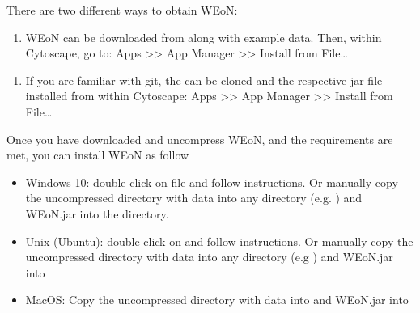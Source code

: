 \documentclass[letterpaper,10pt,english]{sphinxmanual}
\begin{document}

There are two different ways to obtain WEoN:
\begin{enumerate}
\def\theenumi{\arabic{enumi}}
\def\labelenumi{\theenumi .}
\makeatletter\def\p@enumii{\p@enumi \theenumi .}\makeatother
\item {} 
 WEoN can be downloaded from  along with example data. Then, within Cytoscape, go to: Apps \textgreater{}\textgreater{} App Manager \textgreater{}\textgreater{} Install from File…

\end{enumerate}
\begin{enumerate}
\def\theenumi{\arabic{enumi}}
\def\labelenumi{\theenumi .}
\makeatletter\def\p@enumii{\p@enumi \theenumi .}\makeatother
\setcounter{enumi}{1}
\item {} 
 If you are familiar
with git, the  can be cloned and the respective jar file installed from within Cytoscape: Apps \textgreater{}\textgreater{} App Manager \textgreater{}\textgreater{} Install from File…

\end{enumerate}


Once you have downloaded and uncompress WEoN, and the requirements are met, you can install WEoN as follow
\begin{itemize}
\item {} 
Windows 10: double click on  file and follow instructions. Or manually copy the uncompressed directory with data into any directory (e.g. ) and WEoN.jar into the  directory.

\item {} 
Unix (Ubuntu): double click on  and follow instructions. Or manually copy the uncompressed directory with data into any directory (e.g ) and WEoN.jar into 

\item {} 
MacOS: Copy the uncompressed directory with data into  and WEoN.jar into 

\end{itemize}
\end{document}
